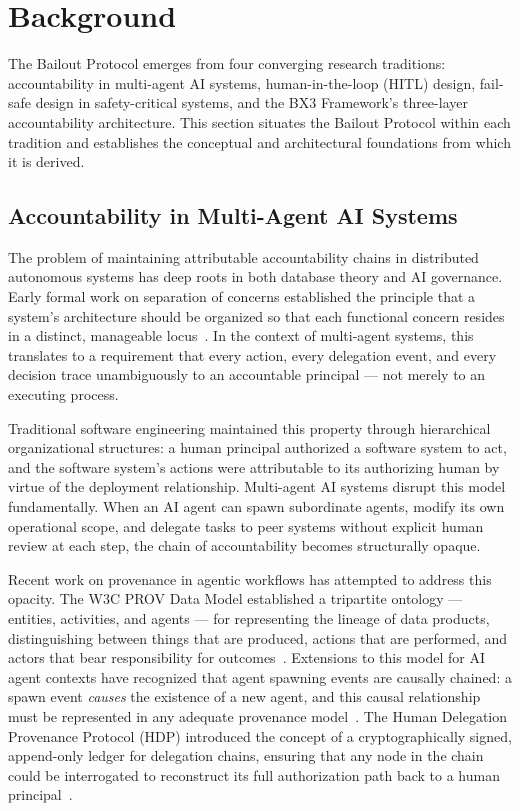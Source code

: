 \section{Background}
\label{sec:bailout-background}

The Bailout Protocol emerges from four converging research traditions: accountability in multi-agent AI systems, human-in-the-loop (HITL) design, fail-safe design in safety-critical systems, and the BX3 Framework's three-layer accountability architecture. This section situates the Bailout Protocol within each tradition and establishes the conceptual and architectural foundations from which it is derived.

\subsection{Accountability in Multi-Agent AI Systems}

The problem of maintaining attributable accountability chains in distributed autonomous systems has deep roots in both database theory and AI governance. Early formal work on separation of concerns established the principle that a system's architecture should be organized so that each functional concern resides in a distinct, manageable locus~\cite{dijkstra1982}. In the context of multi-agent systems, this translates to a requirement that every action, every delegation event, and every decision trace unambiguously to an accountable principal — not merely to an executing process.

Traditional software engineering maintained this property through hierarchical organizational structures: a human principal authorized a software system to act, and the software system's actions were attributable to its authorizing human by virtue of the deployment relationship. Multi-agent AI systems disrupt this model fundamentally. When an AI agent can spawn subordinate agents, modify its own operational scope, and delegate tasks to peer systems without explicit human review at each step, the chain of accountability becomes structurally opaque.

Recent work on provenance in agentic workflows has attempted to address this opacity. The W3C PROV Data Model established a tripartite ontology — entities, activities, and agents — for representing the lineage of data products, distinguishing between things that are produced, actions that are performed, and actors that bear responsibility for outcomes~\cite{moreau2015-prov}. Extensions to this model for AI agent contexts have recognized that agent spawning events are causally chained: a spawn event \textit{causes} the existence of a new agent, and this causal relationship must be represented in any adequate provenance model~\cite{prov-agent2025}. The Human Delegation Provenance Protocol (HDP) introduced the concept of a cryptographically signed, append-only ledger for delegation chains, ensuring that any node in the chain could be interrogated to reconstruct its full authorization path back to a human principal~\cite{hdp-draft}.


